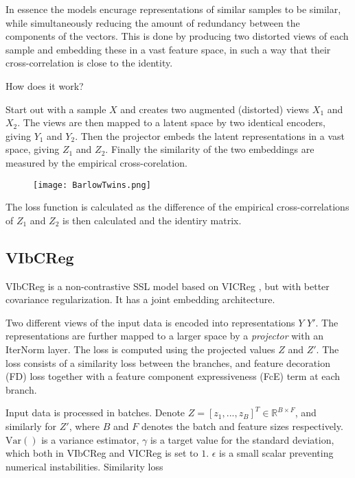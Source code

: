 \documentclass[../../thesis.tex]{subfiles}
\begin{document}
In essence the models encurage representations of similar samples to be similar, while simultaneously reducing the amount of redundancy between the components of the vectors. This is done by producing two distorted views of each sample and embedding these in a vast feature space, in such a way that their cross-correlation is close to the identity. 

How does it work?

Start out with a sample $X$ and creates two augmented (distorted) views $X_1$ and $X_2$. The views are then mapped to a latent space by two identical encoders, giving $Y_1$ and $Y_2$. Then the projector embeds the latent representations in a vast space, giving $Z_1$ and $Z_2$. Finally the similarity of the two embeddings are measured by the empirical cross-corelation.

\begin{figure}[h]
    \texttt{[image: BarlowTwins.png]}
    \centering    
    \caption{\cite{zbontar2021barlow}}
\end{figure}

The loss function is calculated as the difference of the empirical cross-correlations of $Z_1$ and $Z_2$ is then calculated and the identiry matrix. 


\subsection{VIbCReg}

VIbCReg \cite{lee2024vibcreg} is a non-contrastive SSL model based on VICReg \cite{bardes2022vicreg}, but with better covariance regularization.  It has a joint embedding architecture. 

Two different views of the input data is encoded into representations $Y$ $Y'$. The representations are further mapped to a larger space by a \textit{projector} with an IterNorm \cite{huang2019iterative} layer. The loss is computed using the projected values $Z$ and $Z'$. \newline
The loss consists of a similarity loss between the branches, and feature decoration (FD) loss together with a feature component expressiveness (FcE) term at each branch. 

Input data is processed in batches. Denote $Z = [z_1,...,z_B]^T \in \mathbb{R}^{B\times F}$, and similarly for $Z'$, where $B$ and $F$ denotes the batch and feature sizes respectively. $\text{Var}()$ is a variance estimator, $\gamma$ is a target value for the standard deviation, which both in VIbCReg and VICReg is set to $1$. $\epsilon$ is a small scalar preventing numerical instabilities.\newline 
Similarity loss
\end{document}
